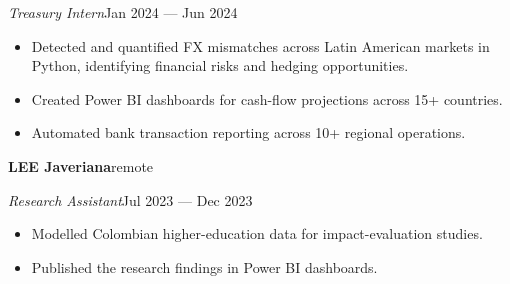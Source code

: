 \documentclass[a4paper,10pt]{article}
\newcommand{\headline}[2]{\needspace{3\baselineskip}\textbf{\color{ink}#1}\hfill{\small #2}\par}
\newcommand{\subline}[2]{\textit{#1}\hfill{\small #2}\par}
\begin{document}
\subline{Treasury Intern}{Jan 2024 --- Jun 2024}
\begin{itemize}[leftmargin=1.1em, itemsep=0pt, topsep=1pt, parsep=0pt]
  \item Detected and quantified FX mismatches across Latin American markets in Python, identifying financial risks and hedging opportunities.
  \item Created Power BI dashboards for cash-flow projections across 15+ countries.
  \item Automated bank transaction reporting across 10+ regional operations.
\end{itemize}
\vspace{4pt}
\headline{LEE Javeriana}{remote}
\vspace{1pt}
\subline{Research Assistant}{Jul 2023 --- Dec 2023}
\begin{itemize}[leftmargin=1.1em, itemsep=0pt, topsep=1pt, parsep=0pt]
  \item Modelled Colombian higher-education data for impact-evaluation studies.
  \item Published the research findings in Power BI dashboards.
\end{itemize}
\vspace{4pt}
\end{document}
